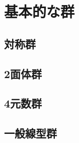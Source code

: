 \documentclass[report]{jlreq}
\begin{document}
%
\chapter{基本的な群}

%
\section{対称群}

%
\section{2面体群}

%
\section{4元数群}

%
\section{一般線型群}
\end{document}
